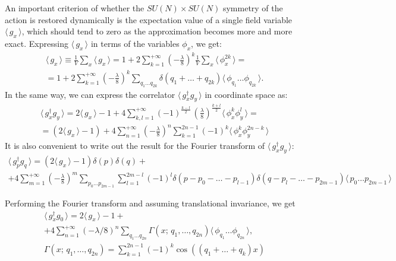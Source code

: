 \documentclass[12pt]{article}
\newcommand{\lr}[1]{ \left( #1 \right) }
\newcommand{\vev}[1]{ \langle \, #1 \, \rangle }
\begin{document}
 An important criterion of whether the $SU\lr{N} \times SU\lr{N}$ symmetry of the action is restored dynamically is the expectation value of a single field variable $\vev{g_x}$, which should tend to zero as the approximation becomes more and more exact. Expressing $\vev{g_x}$ in terms of the variables $\phi_x$, we get:
\begin{eqnarray}
\label{gx_vev_momentum}
 \vev{g_x} \equiv \frac{1}{V} \sum\limits_x \vev{g_x}
 =
 1 + 2 \sum\limits_{k=1}^{+\infty} \lr{-\frac{\lambda}{8}}^k \frac{1}{V} \sum\limits_x \vev{\phi_x^{2 k}}
 = \nonumber \\ =
 1 + 2 \sum\limits_{k=1}^{+\infty} \lr{-\frac{\lambda}{8}}^k
 \sum\limits_{q_1 \ldots q_{2 k}}
 \delta\lr{q_1 + \ldots + q_{2 k}}
 \vev{\phi_{q_1} \ldots \phi_{q_{2k}}} .
\end{eqnarray}
In the same way, we can express the correlator $\vev{g^{\dag}_x g_y}$ in coordinate space as:
\begin{eqnarray}
\label{gxgy_vev_space}
 \vev{g^{\dag}_x g_y}
 =
 2 \vev{g_x} - 1
 +
 4 \sum\limits_{k,l=1}^{+\infty}
 \lr{-1}^{\frac{k-l}{2}} \, \lr{\frac{\lambda}{8}}^{\frac{k+l}{2}}
 \vev{\phi_x^k \phi_y^l}
 = \nonumber \\ =
 \lr{2 \vev{g_x} - 1} + 4 \sum\limits_{n=1}^{+\infty} \lr{-\frac{\lambda}{8}}^n
 \sum\limits_{k=1}^{2 n - 1} \lr{-1}^k \vev{\phi_x^k \phi_y^{2 n - k}}
\end{eqnarray}
It is also convenient to write out the result for the Fourier transform of $\vev{g^{\dag}_x g_y}$:
\begin{eqnarray}
\label{gxgy_vev_fourier}
 \vev{g^{\dag}_p g_q}
 =
 \lr{2 \vev{g_x} - 1} \delta\lr{p} \delta\lr{q}
 + \nonumber \\ +
 4 \sum\limits_{m=1}^{+\infty} \lr{-\frac{\lambda}{8}}^m
 \sum\limits_{p_0 \ldots p_{2 m-1}}
 \sum\limits_{l = 1}^{2 m - l} \lr{-1}^l
 \delta\lr{p - p_0 - \ldots - p_{l-1}}
 \delta\lr{q - p_l - \ldots - p_{2 m - 1}}
 \vev{p_0 \ldots p_{2 m-1}}
\end{eqnarray}


Performing the Fourier transform and assuming translational invariance, we get
\begin{eqnarray}
\label{gx_vev_momentum}
 \vev{g^{\dag}_x g_0}
 =
 2 \vev{g_x} - 1
 + \nonumber \\ +
 4 \sum\limits_{n=1}^{+\infty} \lr{-\lambda/8}^n
 \sum\limits_{q_1 \ldots q_{2 n}}
 \Gamma\lr{x; \, q_1, \ldots, q_{2 n}}
 \vev{\phi_{q_1} \ldots \phi_{q_{2 n}}} ,
 \nonumber \\
 \Gamma\lr{x; \, q_1, \ldots, q_{2 n}} =
 \sum\limits_{k=1}^{2 n - 1} \lr{-1}^k \cos\lr{\lr{q_1 + \ldots + q_k} x}
\end{eqnarray}
\end{document}
